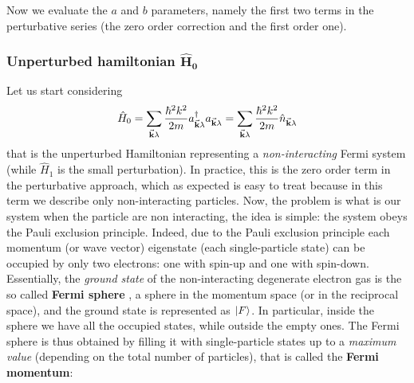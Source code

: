 \documentclass[../main/main.tex]{subfiles}
\begin{document}
Now we evaluate the \( a \) and \( b \) parameters, namely the first two terms in the perturbative series (the zero order correction and the first order one).

\subsubsection{Unperturbed hamiltonian \(\pmb{\hat{H}_0}\)}
Let us start considering
\begin{equation*}
  \hat{H}_0 = \sum_{\va{k} \lambda }^{} \frac{\hbar ^2 k^2}{2m} a_{\va{k} \lambda } ^\dag a_{\va{k}\lambda } = \sum_{\va{k}\lambda }^{} \frac{\hbar ^2 k^2}{2m} \hat{n}_{\va{k} \lambda }
\end{equation*}
that is the unperturbed Hamiltonian representing a \emph{non-interacting} Fermi system (while \(\hat{H}_1\) is the small perturbation). In practice, this is the zero order term in the perturbative approach, which as expected is easy to treat because in this term we describe only non-interacting particles.
Now, the problem is what is our system when the particle are non interacting, the idea is simple: the system obeys the Pauli exclusion principle. Indeed, due to the Pauli exclusion principle each momentum (or wave vector) eigenstate (each single-particle state) can be occupied by only two electrons: one with spin-up and one with spin-down.
Essentially, the \emph{ground state} of the non-interacting degenerate electron gas is the so called \textbf{Fermi sphere} , a sphere in the momentum space (or in the reciprocal space), and the ground state is represented as \( \ket{F}  \).
In particular, inside the sphere we have all the occupied states, while outside the empty ones. The Fermi sphere is thus obtained by filling it with single-particle states up to a \emph{maximum value} (depending on the total number of particles), that is called the \textbf{Fermi momentum}: 
\end{document}
